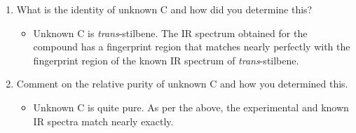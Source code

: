 \documentclass[titlepage]{article}
\begin{document}
\begin{enumerate}
\begin{itemize}
    \end{itemize}
    \item What is the identity of unknown C and how did you determine this?
    \begin{itemize}
        \item Unknown C is \emph{trans}-stilbene. The IR spectrum obtained for the compound has a fingerprint region that matches nearly perfectly with the fingerprint region of the known IR spectrum of \emph{trans}-stilbene.
    \end{itemize}
    \item Comment on the relative purity of unknown C and how you determined this.
    \begin{itemize}
        \item Unknown C is quite pure. As per the above, the experimental and known IR spectra match nearly exactly.
    \end{itemize}
\end{enumerate}
\newpage



\printbibliography
\end{document}
